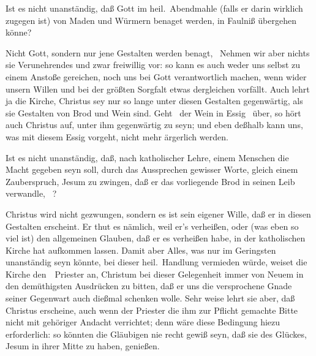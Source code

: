 \begin{aufza}
\item {} Ist es nicht unanständig, daß Gott im heil.\ Abendmahle (falls er darin wirklich zugegen ist) von Maden und Würmern benaget werden, in Faulniß übergehen könne? \usw\par
{} Nicht Gott, sondern nur jene Gestalten werden benagt, \udgl\  Nehmen wir aber nichts sie Verunehrendes und zwar freiwillig vor: so kann es auch weder uns selbst zu einem Anstoße gereichen, noch uns bei Gott verantwortlich machen, wenn wider unsern Willen und bei der größten Sorgfalt etwas dergleichen vorfällt. Auch lehrt ja die Kirche, Christus sey nur so lange unter diesen Gestalten gegenwärtig, als sie Gestalten von Brod und Wein sind. Geht \zB\  der Wein in Essig \udgl\  über, so hört auch Christus auf, unter ihm gegenwärtig zu seyn; und eben deßhalb kann uns, was mit diesem Essig vorgeht, nicht mehr ärgerlich werden.
\item {} Ist es nicht unanständig, daß, nach katholischer Lehre, einem Menschen die Macht gegeben seyn soll, durch das Aussprechen gewisser Worte, gleich einem Zauberspruch, Jesum zu zwingen, daß er das vorliegende Brod in seinen Leib verwandle, \usw\ ?\par
{} Christus wird nicht gezwungen, sondern es ist sein eigener Wille, daß er in diesen Gestalten erscheint. Er thut es nämlich, weil er's verheißen, oder (was eben so viel ist) den allgemeinen Glauben, daß er es verheißen habe, in der katholischen Kirche hat aufkommen lassen. Damit aber Alles, was nur im Geringsten unanständig seyn könnte, bei dieser heil.\ Handlung vermieden würde, weiset die Kirche den~\ Priester an, Christum bei dieser Gelegenheit immer von Neuem in den demüthigsten Ausdrücken zu bitten, daß er uns die versprochene Gnade seiner Gegenwart auch dießmal schenken wolle. Sehr weise lehrt sie aber, daß Christus erscheine, auch wenn der Priester die ihm zur Pflicht gemachte Bitte nicht mit gehöriger Andacht verrichtet; denn wäre diese Bedingung hiezu erforderlich: so könnten die Gläubigen nie recht gewiß seyn, daß sie des Glückes, Jesum in ihrer Mitte zu haben, genießen.
\end{aufza}

